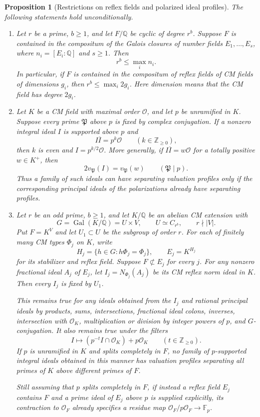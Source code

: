 \documentclass[11pt]{article}
\newtheorem{proposition}[theorem]{Proposition}
\theoremstyle{definition}
\theoremstyle{remark}
\begin{document}
\begin{proposition}[Restrictions on reflex fields and polarized ideal profiles]
\label{prop:restricted-reflex-ideal-constructions}
The following statements hold unconditionally.
\begin{enumerate}
\item
Let $r$ be a prime, $b\geq1$, and let $F/\mathbb Q$ be cyclic
of degree $r^b$.  Suppose $F$ is contained in the compositum of the
Galois closures of number fields $E_1,\ldots,E_s$, where
$n_i=[E_i:\mathbb Q]$ and $s\geq1$.  Then
\[
 r^b\leq\max_i n_i.
\]
In particular, if $F$ is contained in the compositum of reflex fields
of CM fields of dimensions $g_i$, then $r^b\leq\max_i 2g_i$.
Here dimension means that the CM field has degree $2g_i$.

\item
Let $K$ be a CM field with maximal order $\mathcal O$, and let $p$
be unramified in $K$.  Suppose every prime $\mathfrak P$ above $p$
is fixed by complex conjugation.  If a nonzero integral ideal $I$ is
supported above $p$ and
\[
 I\overline I=p^k\mathcal O\qquad(k\in\mathbb Z_{\geq0}),
\]
then $k$ is even and $I=p^{k/2}\mathcal O$.
More generally, if $I\overline I=w\mathcal O$ for a totally positive
$w\in K^+$, then
\[
 2v_{\mathfrak P}(I)=v_{\mathfrak P}(w)
 \qquad(\mathfrak P\mid p).
\]
Thus a family of such ideals can have separating valuation profiles
only if the corresponding principal ideals of the polarizations
already have separating profiles.

\item
Let $r$ be an odd prime, $b\geq1$, and let $K/\mathbb Q$ be an
abelian CM extension with
\[
 G=\operatorname{Gal}(K/\mathbb Q)=U\times V,
 \qquad U\simeq C_{r^b},\qquad r\nmid |V|.
\]
Put $F=K^V$ and let $U_1\subset U$ be the subgroup of order $r$.
For each of finitely many CM types $\Phi_j$ on $K$, write
\[
 H_j=\{h\in G:h\Phi_j=\Phi_j\},\qquad E_j=K^{H_j}
\]
for its stabilizer and reflex field.  Suppose $F\not\subset E_j$
for every $j$.  For any nonzero fractional ideal $A_j$ of $E_j$,
let $I_j=N_{\Phi_j}(A_j)$ be its CM reflex norm ideal in $K$.
Then every $I_j$ is fixed by $U_1$.

This remains true for any ideals obtained from the $I_j$ and rational
principal ideals by products, sums, intersections, fractional ideal
colons, inverses, intersection with $\mathcal O_K$, multiplication or
division by integer powers of $p$, and $G$-conjugation.  It also
remains true under the filters
\[
 I\longmapsto (p^{-t}I\cap\mathcal O_K)+p\mathcal O_K
 \qquad(t\in\mathbb Z_{\geq0}).
\]
If $p$ is unramified in $K$ and splits completely in $F$, no family
of $p$-supported integral ideals obtained in this manner has
valuation profiles separating all primes of $K$ above different
primes of $F$.

Still assuming that $p$ splits completely in $F$, if instead a reflex
field $E_j$ contains $F$ and a prime ideal of
$E_j$ above $p$ is supplied explicitly, its contraction to
$\mathcal O_F$ already specifies a residue map
$\mathcal O_F/p\mathcal O_F\to\mathbb F_p$.
\end{enumerate}
\end{proposition}
\end{document}
